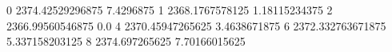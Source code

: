 0 2374.42529296875 7.4296875
1 2368.1767578125 1.18115234375
2 2366.99560546875 0.0
4 2370.45947265625 3.4638671875
6 2372.332763671875 5.337158203125
8 2374.697265625 7.70166015625
